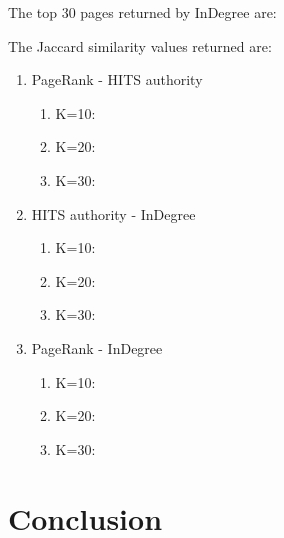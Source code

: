 \documentclass[10pt]{article}
\begin{document}
The top 30 pages returned by InDegree are:

The Jaccard similarity values returned are:
\begin{enumerate}
    \item PageRank - HITS authority
        \begin{enumerate}
            \item K=10:
            \item K=20:
            \item K=30:
        \end{enumerate}
    \item HITS authority - InDegree
        \begin{enumerate}
            \item K=10:
            \item K=20:
            \item K=30:
        \end{enumerate}
    \item PageRank - InDegree
        \begin{enumerate}
            \item K=10:
            \item K=20:
            \item K=30:
        \end{enumerate}
\end{enumerate}
\section{Conclusion}
\newpage

 
\end{document}
